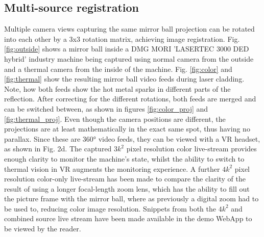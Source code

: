 \documentclass[10pt]{article}
\begin{document}
\begin{multicols}{2}
	\subsection{Multi-source registration}
	Multiple camera views capturing the same mirror ball projection can be rotated into each other by a 3x3 rotation matrix, achieving image registration. Fig. \ref{fig:outside} shows a mirror ball inside a DMG MORI 'LASERTEC 3000 DED hybrid' industry machine being captured using normal camera from the outside and a thermal camera from the inside of the machine. Fig. \ref{fig:color} and \ref{fig:thermal} show the resulting mirror ball video feeds during laser cladding. Note, how both feeds show the hot metal sparks in different parts of the reflection. After correcting for the different rotations, both feeds are merged and can be switched between, as shown in figures \ref{fig:color_proj} and \ref{fig:thermal_proj}. Even though the camera positions are different, the projections are at least mathematically in the exact same spot, thus having no parallax. Since these are 360° video feeds, they can be viewed with a VR headset, as shown in Fig. 2d. The captured $3k^2$ pixel resolution color live-stream provides enough clarity to monitor the machine's state, whilst the ability to switch to thermal vision in VR augments the monitoring experience. A further $4k^2$ pixel resolution color-only live-stream has been made to compare the clarity of the result of using a longer focal-length zoom lens, which has the ability to fill out the picture frame with the mirror ball, where as previously a digital zoom had to be used to, reducing color image resolution. Snippets from both the $4k^2$ and combined source live stream have been made available in the demo WebApp to be viewed by the reader.


\end{multicols}
\end{document}
